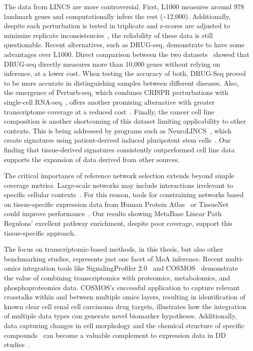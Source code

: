 The data from \gls{LINCS} are more controversial. 
First, L1000 measures around 978 landmark genes and computationally infers the rest (\textasciitilde12,000). 
Additionally, despite each perturbation is tested in triplicate and z-scores are adjusted to minimize replicate inconsistencies~\cite{RN30}, the reliability of these data is still questionable. 
Recent alternatives, such as DRUG-seq, demonstrate to have some advantages over L1000. 
Direct comparison between the two datasets~\cite{RN130, RN105} showed that DRUG-seq directly measures more than 10,000 genes without relying on inference, at a lower cost. 
When testing the accuracy of both, DRUG-Seq proved to be more accurate in distinguishing samples between different diseases. 
Also, the emergence of Perturb-seq, which combines \gls{CRISPR} perturbations with single-cell RNA-seq~\cite{RN89}, offers another promising alternative with greater transcriptome coverage at a reduced cost~\cite{RN165}. 
Finally, the cancer cell line composition is another shortcoming of this dataset limiting applicability to other contexts. 
This is being addressed by programs such as Neuro\gls{LINCS}~\cite{RN164}, which create signatures using patient-derived induced pluripotent stem cells~\cite{RN165}. 
Our finding that tissue-derived signatures consistently outperformed cell line data supports the expansion of data derived from other sources.

The critical importance of reference network selection extends beyond simple coverage metrics. 
Large-scale networks may include interactions irrelevant to specific cellular contexts~\cite{RN38}. 
For this reason, tools for constraining networks based on tissue-specific expression data from Human Protein Atlas~\cite{RN166} or TissueNet~\cite{RN137} could improve performance~\cite{RN38}. 
Our results showing MetaBase Linear Path Regulons' excellent pathway enrichment, despite poor coverage, support this tissue-specific approach.

The focus on transcriptomic-based methods, in this thesis, but also other benchmarking studies, represents just one facet of \gls{MoA} inference.
Recent multi-omics integration tools like SignalingProfiler 2.0~\cite{RN100} and COSMOS~\cite{RN99} demonstrate the value of combining transcriptomics with proteomics, metabolomics, and phosphoproteomics data. 
COSMOS's successful application to capture relevant crosstalks within and between multiple omics layers, resulting in identification of known clear cell renal cell carcinoma drug targets, illustrates how the integration of multiple data types can generate novel biomarker hypotheses. 
Additionally, data capturing changes in cell morphology and the chemical structure of specific compounds~\cite{RN167} can become a valuable complement to expression data in \gls{DD} studies~\cite{RN38}. 

